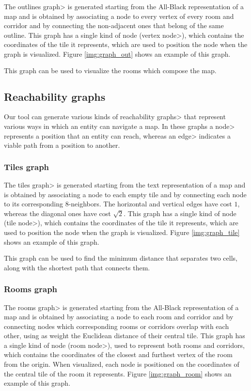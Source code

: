The \<outlines graph> is generated starting from the All-Black representation of a map and is obtained by associating a node to every vertex of every room and corridor and by connecting the non-adjacent ones that belong of the same outline. This graph has a single kind of node (\<vertex node>), which contains the coordinates of the tile it represents, which are used to position the node when the graph is visualized. Figure \ref{img:graph_out} shows an example of this graph.

\par

This graph can be used to visualize the rooms which compose the map.

\subsection{Reachability graphs}

Our tool can generate various kinds of \<reachability graphs> that represent various ways in which an entity can navigate a map. In these graphs a \<node> represents a position that an entity can reach, whereas an \<edge> indicates a viable path from a position to another.

\subsubsection{Tiles graph}

The \<tiles graph> is generated starting from the text representation of a map and is obtained by associating a node to each empty tile and by connecting each node to its corresponding 8-neighbors. The horizontal and vertical edges have cost $1$, whereas the diagonal ones have cost $\sqrt{2}$. This graph has a single kind of node (\<tile node>), which contains the coordinates of the tile it represents, which are used to position the node when the graph is visualized. Figure \ref{img:graph_tile} shows an example of this graph.

\par

This graph can be used to find the minimum distance that separates two cells, along with the shortest path that connects them.

\subsubsection{Rooms graph}

The \<rooms graph> is generated starting from the All-Black representation of a map and is obtained by associating a node to each room and corridor and by connecting nodes which corresponding rooms or corridors overlap with each other, using as weight the Euclidean distance of their central tile. This graph has a single kind of node (\<room node>), used to represent both rooms and corridors, which contains the coordinates of the closest and furthest vertex of the room from the origin. When visualized, each node is positioned on the coordinates of the central tile of the room it represents. Figure \ref{img:graph_room} shows an example of this graph.

